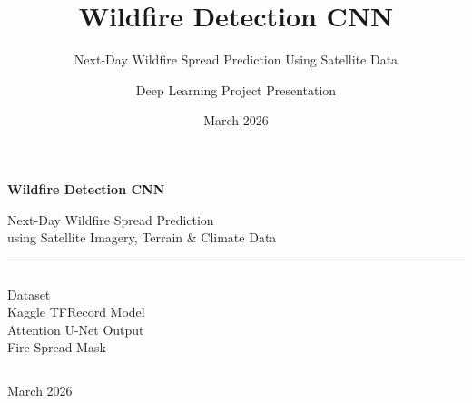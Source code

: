 ﻿\documentclass[aspectratio=169,t]{beamer}
\title{\textcolor{firered}{Wildfire Detection CNN}}
\subtitle{Next-Day Wildfire Spread Prediction Using Satellite Data}
\author{Deep Learning Project Presentation}
\date{March 2026}
\begin{document}
{
\begin{frame}[plain]
  \vspace{1.5cm}
  \begin{center}
    {\Huge \textbf{\textcolor{firered}{Wildfire Detection CNN}}}
    \vspace{0.4cm}

    {\large \textcolor{accent}{Next-Day Wildfire Spread Prediction}}\\[0.2cm]
    {\normalsize \textcolor{textsecondary}{using Satellite Imagery, Terrain \& Climate Data}}
    \vspace{0.8cm}

    \textcolor{textsecondary}{\rule{10cm}{0.4pt}}
    \vspace{0.4cm}

    \begin{columns}[c]
      \centering
        \textcolor{accentgreen}{\large Dataset}\\\textcolor{textsecondary}{\small Kaggle TFRecord}
      \centering
        \textcolor{accent}{\large Model}\\\textcolor{textsecondary}{\small Attention U-Net}
      \centering
        \textcolor{accentorange}{\large Output}\\\textcolor{textsecondary}{\small Fire Spread Mask}
    \end{columns}
    \vspace{0.8cm}
    \textcolor{textsecondary}{\small March 2026}
  \end{center}
\end{frame}
}
\end{document}
